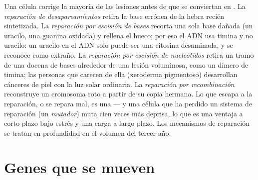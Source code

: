 \begin{proposition}\label{prop:b2:genome-diversification:repair}
Una célula corrige la mayoría de las lesiones antes de que se conviertan
en . La \emph{reparación de desapareamientos} retira la base
errónea de la hebra recién sintetizada. La \emph{reparación por escisión
de bases} recorta una sola base dañada (un uracilo, una guanina oxidada)
y rellena el hueco; por eso el ADN usa timina y no uracilo: un uracilo en
el ADN solo puede ser una citosina desaminada, y se reconoce como
extraño. La \emph{reparación por escisión de nucleótidos} retira un tramo
de una docena de bases alrededor de una lesión voluminosa, como un dímero
de timina; las personas que carecen de ella (xeroderma pigmentoso)
desarrollan cánceres de piel con la luz solar ordinaria. La
\emph{reparación por recombinación} reconstruye un cromosoma roto a partir
de su copia hermana. Lo que escapa a la reparación, o se repara mal, es
una  --- y una célula que ha perdido un sistema de reparación (un
\emph{mutador}) muta cien veces más deprisa, lo que es una ventaja a
corto plazo bajo estrés y una carga a largo plazo. Los mecanismos de
reparación se tratan en profundidad en el volumen del tercer año.
\end{proposition}

\section{Genes que se mueven}

